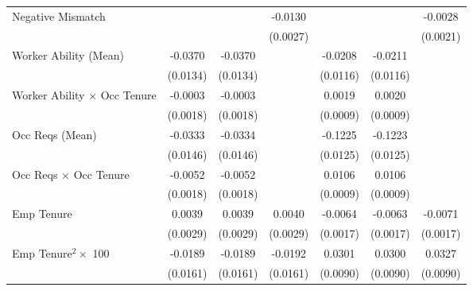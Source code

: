 {\begin{longtable}{l*{6}{c}}
Negative Mismatch   &                     &                     &     -0.0130\sym{***}&                     &                     &     -0.0028         \\
                    &                     &                     &    (0.0027)         &                     &                     &    (0.0021)         \\
Worker Ability (Mean)&     -0.0370\sym{***}&     -0.0370\sym{***}&                     &     -0.0208\sym{*}  &     -0.0211\sym{*}  &                     \\
                    &    (0.0134)         &    (0.0134)         &                     &    (0.0116)         &    (0.0116)         &                     \\
Worker Ability $\times$ Occ Tenure&     -0.0003         &     -0.0003         &                     &      0.0019\sym{**} &      0.0020\sym{**} &                     \\
                    &    (0.0018)         &    (0.0018)         &                     &    (0.0009)         &    (0.0009)         &                     \\
Occ Reqs (Mean)     &     -0.0333\sym{**} &     -0.0334\sym{**} &                     &     -0.1225\sym{***}&     -0.1223\sym{***}&                     \\
                    &    (0.0146)         &    (0.0146)         &                     &    (0.0125)         &    (0.0125)         &                     \\
Occ Reqs $\times$ Occ Tenure&     -0.0052\sym{***}&     -0.0052\sym{***}&                     &      0.0106\sym{***}&      0.0106\sym{***}&                     \\
                    &    (0.0018)         &    (0.0018)         &                     &    (0.0009)         &    (0.0009)         &                     \\
Emp Tenure          &      0.0039         &      0.0039         &      0.0040         &     -0.0064\sym{***}&     -0.0063\sym{***}&     -0.0071\sym{***}\\
                    &    (0.0029)         &    (0.0029)         &    (0.0029)         &    (0.0017)         &    (0.0017)         &    (0.0017)         \\
Emp Tenure$^2\times$ 100&     -0.0189         &     -0.0189         &     -0.0192         &      0.0301\sym{***}&      0.0300\sym{***}&      0.0327\sym{***}\\
                    &    (0.0161)         &    (0.0161)         &    (0.0161)         &    (0.0090)         &    (0.0090)         &    (0.0090)         \\

\end{longtable}}
